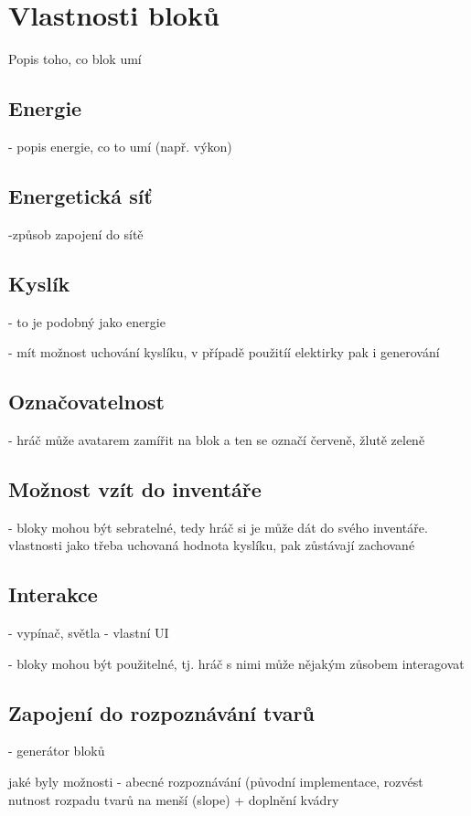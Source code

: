 
\section{Vlastnosti bloků}

Popis toho, co blok umí


\subsection{Energie}

- popis energie, co to umí (např. výkon)

\subsection{Energetická síť}

-způsob zapojení do sítě

\subsection{Kyslík}

- to je podobný jako energie

- mít možnost uchování kyslíku, v případě použitíí elektirky pak i generování


\subsection{Označovatelnost}

- hráč může avatarem zamířit na blok a ten se označí červeně, žlutě zeleně



\subsection{Možnost vzít do inventáře}

- bloky mohou být sebratelné, tedy hráč si je může dát do svého inventáře. vlastnosti jako třeba uchovaná hodnota kyslíku, pak zůstávají zachované


\subsection{Interakce}

- vypínač, světla - vlastní UI


- bloky mohou být použitelné, tj. hráč s nimi může nějakým zůsobem interagovat


\subsection{Zapojení do rozpoznávání tvarů}

- generátor bloků

jaké byly možnosti - abecné rozpoznávání (původní implementace, rozvést nutnost rozpadu tvarů na menší (slope) + doplnění kvádry

